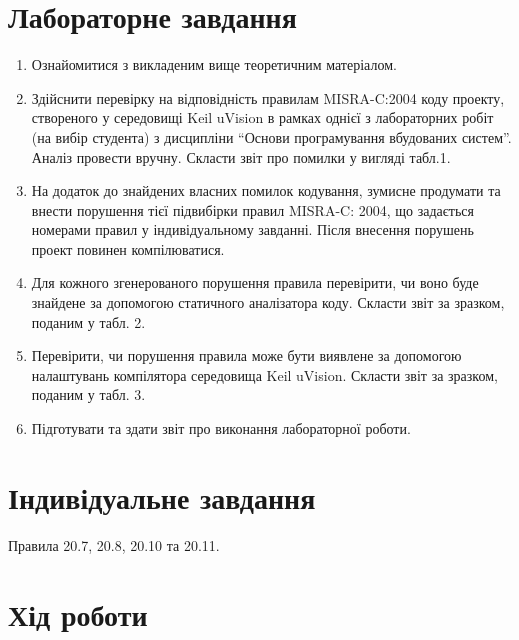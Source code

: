 \documentclass[oneside,14pt]{extarticle}
\begin{document}
\begin{normalsize}
    \section*{Лабораторне завдання}
    \begin{enumerate}
        \item Ознайомитися з викладеним вище теоретичним матеріалом. 
        \item Здійснити перевірку на відповідність правилам MISRA-C:2004 коду проекту, створеного у середовищі Keil uVision в рамках однієї з лабораторних робіт (на вибір студента) з дисципліни “Основи програмування вбудованих систем”. Аналіз провести вручну. Скласти звіт про помилки у вигляді табл.1.
        \item На додаток до знайдених власних помилок кодування, зумисне продумати та внести порушення тієї підвибірки правил MISRA-C: 2004, що задається номерами правил у індивідуальному завданні. Після внесення порушень проект повинен компілюватися.
        \item Для кожного згенерованого порушення правила перевірити, чи воно буде знайдене за допомогою статичного аналізатора коду. Скласти звіт за зразком, поданим у табл. 2.
        \item Перевірити, чи порушення правила може бути виявлене за допомогою налаштувань компілятора середовища Keil uVision. Скласти звіт за зразком, поданим у табл. 3.
        \item Підготувати та здати звіт про виконання лабораторної роботи.
    \end{enumerate}
    
    \section*{Індивідуальне завдання}
    Правила 20.7, 20.8, 20.10 та 20.11.

	\section*{Хід роботи}
	
\begin{table}[H]
  \centering
  \caption{Звіт про порушення правил MISRA-C: 2004, знайдені шляхом перегляду коду}
  \label{tab:my-table}
  \renewcommand{\arraystretch}{1.5}
\end{table}


\end{normalsize}
\end{document}
